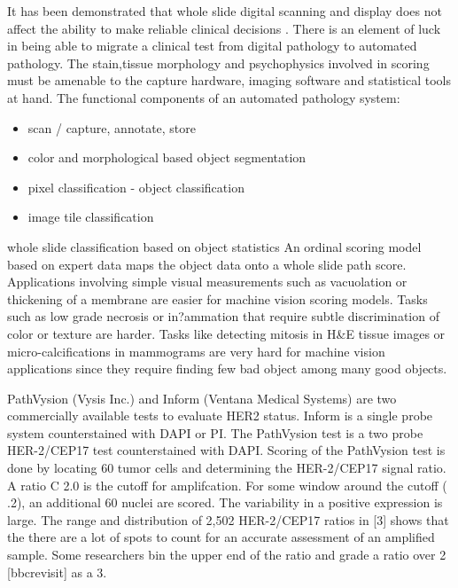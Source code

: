 It has been demonstrated that whole slide digital scanning and display does not affect the ability to make reliable clinical decisions \cite{HER2FISH2} \cite{HER2FISH3} \cite{HER2FISH4} \cite{HER2FISH5} \cite{HER2FISH6} \cite{HER2FISH7} \cite{HER2FISH8}. There is an element of luck in being able to migrate a clinical test from digital pathology to automated pathology. The stain,tissue morphology and psychophysics involved in scoring must be amenable to the capture hardware, imaging software and statistical tools at hand. The functional components of an automated pathology system:
\begin{itemize}
\item 	scan / capture, annotate, store
\item color and morphological based object segmentation
\item	pixel classification - object classification
\item	image tile classification
\end{itemize}
 whole slide classification based on object statistics An ordinal scoring model based on expert data maps the object data onto a whole slide path score. Applications involving simple visual measurements such as vacuolation or thickening of a membrane are easier for machine vision scoring models. Tasks such as low grade necrosis or in?ammation that require subtle discrimination of color or texture are harder. Tasks like detecting mitosis in H\&E tissue images or micro-calcifications in mammograms are very hard for machine vision applications since they require finding few bad object among many good objects.

PathVysion (Vysis Inc.) and Inform (Ventana Medical Systems) are two commercially available tests to evaluate HER2 status. Inform is a single probe system counterstained with DAPI or PI. The PathVysion test is a two probe HER-2/CEP17 test counterstained with DAPI. Scoring of the PathVysion test is done by locating 60 tumor cells and determining the HER-2/CEP17 signal ratio. A ratio C 2.0 is the cutoff for amplifcation. For some window around the cutoff ( .2), an additional 60 nuclei are scored. The variability in a positive expression is large. The range and distribution of 2,502 HER-2/CEP17 ratios in [3] shows that the there are a lot of spots to count for an accurate assessment of an amplified sample. Some researchers bin the upper end of the ratio and grade a ratio over 2 [bbcrevisit] as a 3.

